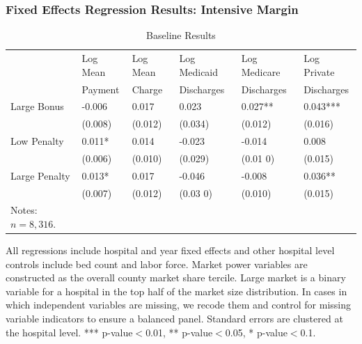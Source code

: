 \documentclass[ucs,9pt]{beamer}
\begin{document}
\begin{frame}
\frametitle{Fixed Effects Regression Results: Intensive Margin}
\begin{table}[htp]
\centering \normalsize
\caption{Baseline Results}
\label{tab:samplemort}
\footnotesize
\begin{tabular}{llllll}
\hline	
 			& Log Mean		& Log Mean		& Log Medicaid 	   	& Log Medicare   		& Log Private  			\\
			& Payment		& 	Charge		& Discharges      		& Discharges       		& Discharges        	\\
\hline
Large Bonus	&	-0.006	&	0.017	&	0.023	&	0.027**	&	0.043***	\\
			&	(0.008)	&	(0.012)	&	(0.034)	&	(0.012)	&	(0.016)	\\
Low Penalty	&	0.011*	&	0.014	&	-0.023	&	-0.014	&	0.008	\\
			&	(0.006)	&	(0.010)	& 	(0.029)	&	(0.01	0)	&	(0.015)	\\
Large Penalty	&	0.013*	&	0.017	&	-0.046	&	-0.008	&	0.036**	\\
			&	(0.007)	&	(0.012)	&	(0.03	0) 	&	(0.010)	&	(0.015)	\\
\hline
\tiny Notes: $n=8,316$.  
\end{tabular}
\end{table}
\tiny All regressions include hospital and year fixed effects and other hospital level controls include bed count and labor force.  Market power variables are constructed as the overall county market share tercile.  Large market is a binary variable for a hospital in the top half of the market size distribution.  In cases in which independent variables are missing, we recode them and control for missing variable indicators to ensure a balanced panel.  Standard errors are clustered at the hospital level.  *** p-value$<$0.01, ** p-value$<$0.05, * p-value$<$0.1.
\end{frame}
\end{document}
